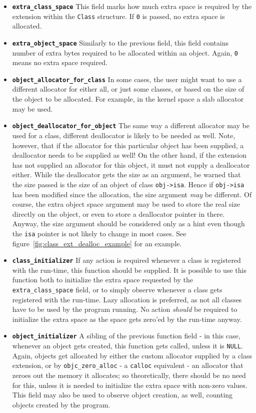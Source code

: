 \begin{itemize}
  \item{\bf{\tt{extra\_class\_space}}} This field marks how much extra space is required by the extension within the \texttt{Class} structure. If \texttt{0} is passed, no extra space is allocated.
  \item{\bf{\tt{extra\_object\_space}}} Similarly to the previous field, this field contains number of extra bytes required to be allocated within an object. Again, \texttt{0} means no extra space required.
  \item{\bf{\tt{object\_allocator\_for\_class}}} In some cases, the user might want to use a different allocator for either all, or just some classes, or based on the size of the object to be allocated. For example, in the kernel space a slab allocator may be used.
  \item{\bf{\tt{object\_deallocator\_for\_object}}} The same way a different allocator may be used for a class, different deallocator is likely to be needed as well. Note, however, that if the allocator for this particular object has been supplied, a deallocator needs to be supplied as well! On the other hand, if the extension has not supplied an allocator for this object, it must not supply a deallocator either.
  While the deallocator gets the size as an argument, be warned that the size passed is the size of an object of class \verb=obj->isa=. Hence if \verb=obj->isa= has been modified since the allocation, the size argument \emph{may} be different. Of course, the extra object space argument may be used to store the real size directly on the object, or even to store a deallocator pointer in there. Anyway, the size argument should be considered only as a hint even though the \verb=isa= pointer is not likely to change in most cases.
  See figure~\ref{fig:class_ext_dealloc_example} for an example.
  \item{\bf{\tt{class\_initializer}}} If any action is required whenever a class is registered with the run-time, this function should be supplied. It is possible to use this function both to initialize the extra space requested by the \texttt{extra\_class\_space} field, or to simply observe whenever a class gets registered with the run-time. Lazy allocation is preferred, as not all classes have to be used by the program running. No action \emph{should} be required to initialize the extra space as the space gets zero'ed by the run-time anyway.
  \item{\bf{\tt{object\_initializer}}} A sibling of the previous function field - in this case, whenever an object gets created, this function gets called, unless it is \texttt{NULL}. Again, objects get allocated by either the custom allocator supplied by a class extension, or by \verb=objc_zero_alloc= - a \verb=calloc= equivalent - an allocator that zeroes out the memory it allocates; so theoretically, there should be no need for this, unless it is needed to initialize the extra space with non-zero values. This field may also be used to observe object creation, as well, counting objects created by the program.

\end{itemize}
